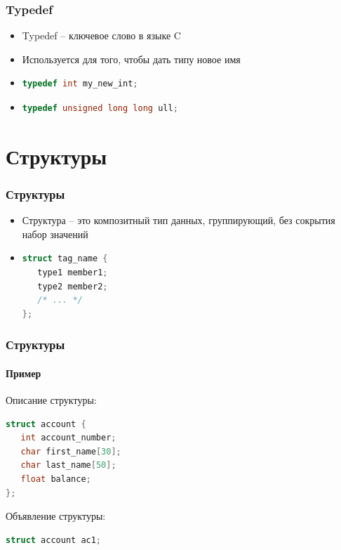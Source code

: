 \documentclass[12pt,pdf,hyperref={unicode}]{beamer}
\begin{document}
\begin{frame}[fragile]
\frametitle{Typedef} 
\begin{itemize}
\item Typedef -- ключевое слово в языке C \\
\item Используется для того, чтобы дать типу новое имя \\
\item 
\begin{lstlisting}[language=C++,basicstyle=\ttfamily,keywordstyle=\color{blue}]
typedef int my_new_int;
\end{lstlisting}
\item 
\begin{lstlisting}[language=C++,basicstyle=\ttfamily,keywordstyle=\color{blue}]
typedef unsigned long long ull;
\end{lstlisting}
\end{itemize}
\end{frame}




\section{Структуры}



\begin{frame}[fragile]
\frametitle{Структуры} 
\begin{itemize}
\item Структура -- это композитный тип данных, группирующий, без сокрытия набор значений \\
\item 
\begin{lstlisting}[language=C++,basicstyle=\ttfamily,keywordstyle=\color{blue}]
struct tag_name {
   type1 member1;
   type2 member2;
   /* ... */
};
\end{lstlisting}
\end{itemize}
\end{frame}


\begin{frame}[fragile]
\frametitle{Структуры} 
\framesubtitle{Пример} 
Описание структуры:
\begin{lstlisting}[language=C++,basicstyle=\ttfamily,keywordstyle=\color{blue}]
struct account {
   int account_number;
   char first_name[30];
   char last_name[50];
   float balance;
};
\end{lstlisting}
Объявление структуры:
\begin{lstlisting}[language=C++,basicstyle=\ttfamily,keywordstyle=\color{blue}]
struct account ac1;
\end{lstlisting}
\end{frame}
\end{document}
